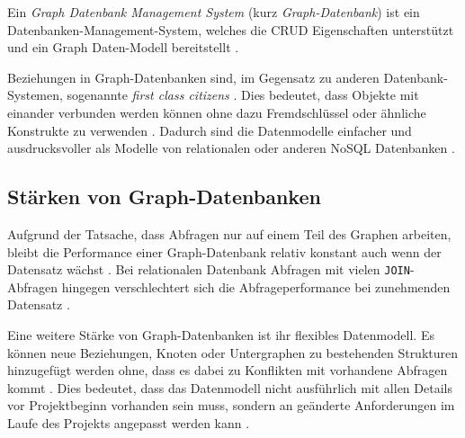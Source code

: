 Ein \emph{Graph Datenbank Management System} (kurz \emph{Graph-Datenbank}) ist ein Datenbanken-Management-System, welches die \ac{CRUD} Eigenschaften unterstützt und ein Graph Daten-Modell bereitstellt \cite{robinsongraph:2015}.

Beziehungen in Graph-Datenbanken sind, im Gegensatz zu anderen Datenbank-Systemen, sogenannte \emph{first class citizens} \cite{robinsongraph:2015}. Dies bedeutet, dass Objekte mit einander verbunden werden können ohne dazu Fremdschlüssel oder ähnliche Konstrukte zu verwenden \cite{robinsongraph:2015}. Dadurch sind die Datenmodelle einfacher und ausdrucksvoller als Modelle von relationalen oder anderen \ac{NoSQL} Datenbanken \cite{robinsongraph:2015} .

\subsection{Stärken von Graph-Datenbanken}
Aufgrund der Tatsache, dass Abfragen nur auf einem Teil des Graphen arbeiten, bleibt die Performance einer Graph-Datenbank relativ konstant auch wenn der Datensatz wächst \cite{robinsongraph:2015}. Bei relationalen Datenbank Abfragen mit vielen \verb|JOIN|-Abfragen hingegen verschlechtert sich die Abfrageperformance bei zunehmenden Datensatz \cite{robinsongraph:2015}. 

Eine weitere Stärke von Graph-Datenbanken ist ihr flexibles Datenmodell. Es können neue Beziehungen, Knoten oder Untergraphen zu bestehenden Strukturen hinzugefügt werden ohne, dass es dabei zu Konflikten mit vorhandene Abfragen kommt \cite{robinsongraph:2015}. Dies bedeutet, dass das Datenmodell nicht ausführlich mit allen Details vor Projektbeginn vorhanden sein muss, sondern an geänderte Anforderungen im Laufe des Projekts angepasst werden kann \cite{robinsongraph:2015}. 
